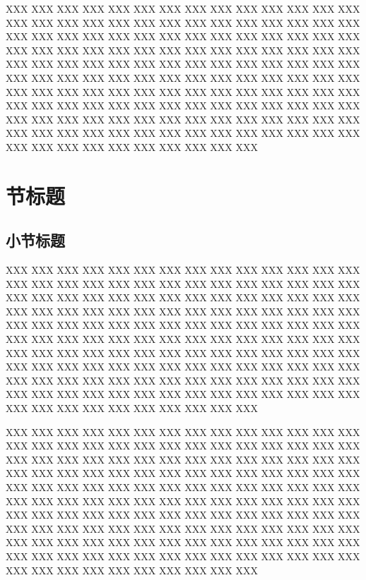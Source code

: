 XXX XXX XXX XXX XXX XXX XXX XXX XXX XXX XXX XXX XXX XXX XXX
XXX XXX XXX XXX XXX XXX XXX XXX XXX XXX XXX XXX XXX XXX XXX
XXX XXX XXX XXX XXX XXX XXX XXX XXX XXX XXX XXX XXX XXX XXX
XXX XXX XXX XXX XXX XXX XXX XXX XXX XXX XXX XXX XXX XXX XXX
XXX XXX XXX XXX XXX XXX XXX XXX XXX XXX XXX XXX XXX XXX XXX
XXX XXX XXX XXX XXX XXX XXX XXX XXX XXX XXX XXX XXX XXX XXX
XXX XXX XXX XXX XXX XXX XXX XXX XXX XXX XXX XXX XXX XXX XXX
XXX XXX XXX XXX XXX XXX XXX XXX XXX XXX XXX XXX XXX XXX XXX
XXX XXX XXX XXX XXX XXX XXX XXX XXX XXX XXX XXX XXX XXX XXX
XXX XXX XXX XXX XXX XXX XXX XXX XXX XXX XXX XXX XXX XXX XXX

\section{节标题}

\subsection{小节标题}

XXX XXX XXX XXX XXX XXX XXX XXX XXX XXX XXX XXX XXX XXX XXX
XXX XXX XXX XXX XXX XXX XXX XXX XXX XXX XXX XXX XXX XXX XXX
XXX XXX XXX XXX XXX XXX XXX XXX XXX XXX XXX XXX XXX XXX XXX
XXX XXX XXX XXX XXX XXX XXX XXX XXX XXX XXX XXX XXX XXX XXX
XXX XXX XXX XXX XXX XXX XXX XXX XXX XXX XXX XXX XXX XXX XXX
XXX XXX XXX XXX XXX XXX XXX XXX XXX XXX XXX XXX XXX XXX XXX
XXX XXX XXX XXX XXX XXX XXX XXX XXX XXX XXX XXX XXX XXX XXX
XXX XXX XXX XXX XXX XXX XXX XXX XXX XXX XXX XXX XXX XXX XXX
XXX XXX XXX XXX XXX XXX XXX XXX XXX XXX XXX XXX XXX XXX XXX
XXX XXX XXX XXX XXX XXX XXX XXX XXX XXX XXX XXX XXX XXX XXX

XXX XXX XXX XXX XXX XXX XXX XXX XXX XXX XXX XXX XXX XXX XXX
XXX XXX XXX XXX XXX XXX XXX XXX XXX XXX XXX XXX XXX XXX XXX
XXX XXX XXX XXX XXX XXX XXX XXX XXX XXX XXX XXX XXX XXX XXX
XXX XXX XXX XXX XXX XXX XXX XXX XXX XXX XXX XXX XXX XXX XXX
XXX XXX XXX XXX XXX XXX XXX XXX XXX XXX XXX XXX XXX XXX XXX
XXX XXX XXX XXX XXX XXX XXX XXX XXX XXX XXX XXX XXX XXX XXX
XXX XXX XXX XXX XXX XXX XXX XXX XXX XXX XXX XXX XXX XXX XXX
XXX XXX XXX XXX XXX XXX XXX XXX XXX XXX XXX XXX XXX XXX XXX
XXX XXX XXX XXX XXX XXX XXX XXX XXX XXX XXX XXX XXX XXX XXX
XXX XXX XXX XXX XXX XXX XXX XXX XXX XXX XXX XXX XXX XXX XXX
